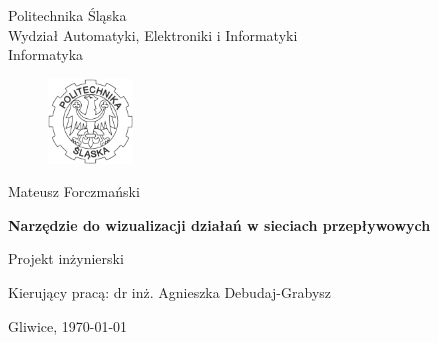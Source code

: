 

\pagestyle{empty}
\sffamily

\noindent
\begin{center}
    \Large
    Politechnika Śląska\\
    Wydział Automatyki, Elektroniki i Informatyki
    \\ Informatyka
\end{center}

\begin{figure}[h]
\begin{center}
\includegraphics[width=0.2\textwidth]{./img/polsl}
\end{center}
\end{figure}

\vfill\vfill
\begin{center}
    \Large
    Mateusz Forczmański
\end{center}

\vfill
\begin{center}
    \Huge\bfseries
    Narzędzie do wizualizacji działań w sieciach przepływowych
\end{center}

\vfill
\begin{center}
    \Large
    Projekt inżynierski
\end{center}

\vfill\vfill\vfill
\begin{center}
    \Large
    Kierujący pracą: dr inż. Agnieszka Debudaj-Grabysz
\end{center}

\vfill
\begin{center}
\large
   Gliwice, \today
\end{center}

\cleardoublepage


\rmfamily
\normalfont

\pagestyle{headings}
\tableofcontents



